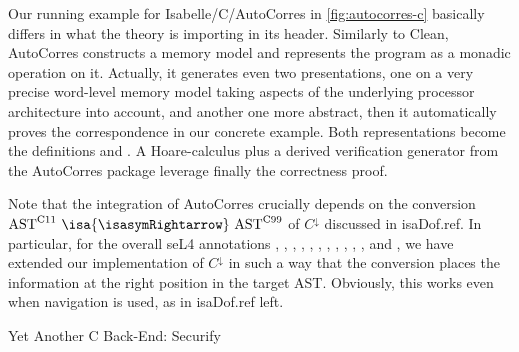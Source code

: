 \begin{isabellebody}
\begin{isamarkuptext}
\begin{figure}
\end{figure}
Our running example  for Isabelle/C/AutoCorres in \autoref{fig:autocorres-c} basically differs in what
the theory is importing in its header. Similarly to Clean, AutoCorres constructs a memory model and
represents the program as a monadic operation on it. Actually, it generates even two presentations,
one on a very precise word-level memory model taking aspects of the underlying processor
architecture into account, and another one more abstract, then it automatically proves the
correspondence in our concrete example. Both representations become the definitions
 and . A Hoare-calculus plus
a derived verification generator  from the AutoCorres package
leverage finally the correctness proof.%
\end{isamarkuptext}\isamarkuptrue%
%
\begin{isamarkuptext}%
Note that the integration of AutoCorres crucially depends on the conversion
$\text{AST}^\text{C11}~\isa{{\isasymRightarrow}}~\text{AST}^\text{C99}$ of $C^\downarrow$
discussed in \csname isaDof.ref. In particular, for the overall seL4
annotations
,
,
,
,
,
,
,
,
,
,
, and
,
we have extended our implementation of $C^\downarrow$ in such a way that the conversion places the
information at the right position in the target AST. Obviously, this works even when navigation is
used, as in \csname isaDof.ref left.%
\end{isamarkuptext}\isamarkuptrue%
%
\begin{isamarkupsubsection*}%
[label = {securify},type = {scholarly_paper.technical}, args={label = {securify},type = {scholarly_paper.technical}, Isa_COL.text_element.level = {}, Isa_COL.text_element.referentiable = {False}, Isa_COL.text_element.variants = {{STR ''outline'', STR ''document''}}, scholarly_paper.text_section.main_author = {}, scholarly_paper.text_section.fixme_list = {}, Isa_COL.text_element.level = {}, scholarly_paper.technical.definition_list = {}}]Yet Another C Back-End: Securify%

\end{isamarkupsubsection*}
\end{isabellebody}
